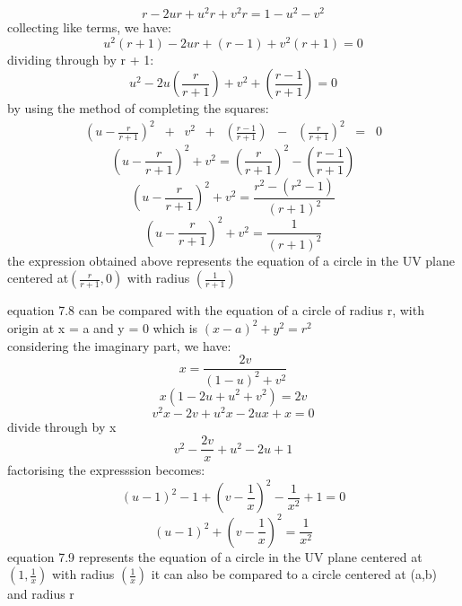 \begin{equation*}
r - 2ur + u^2r + v^2r = 1 - u^2 - v^2
\end{equation*}
collecting like terms, we have:
\begin{equation*}
u^2(r + 1) -2ur + (r - 1) + v^2(r + 1) = 0
\end{equation*}
dividing through by r + 1:
\begin{equation}
u^2 - 2u(\frac{r}{r + 1}) + v^2 +(\frac{r - 1}{r + 1}) = 0
\end{equation}
by using the method of completing the squares:\\
\begin{align*}
(u - \frac{r}{r+1})^2\;\;+\;\;v^2\;\;+\;\;(\frac{r-1}{r+1})\;\; - \;\;(\frac{r}{r+1})^2\;\; = \;\;0
\end{align*}
\begin{equation*}
(u - \frac{r}{r + 1})^2 + v^2 =(\frac{r}{r + 1})^2 -(\frac{r - 1}{r + 1}) 
\end{equation*}
\begin{equation*}
(u - \frac{r}{r + 1})^2+ v^2 =\frac{r^2 -(r^2 -1)}{(r + 1)^2}
\end{equation*}
\begin{equation}
(u - \frac{r}{r + 1})^2+ v^2 = \frac{1}{(r + 1)^2}
\end{equation}
the expression obtained above represents the equation of a circle in the UV plane centered at$ (\frac{r}{r + 1}, 0) $ with radius $ (\frac{1}{r + 1}) $

equation 7.8 can be compared  with  the equation of a circle of radius r, with origin at x = a and y = 0 which is $ (x - a)^2 + y^2 = r^2 $\\ 
considering the imaginary part, we have:
\begin{equation*}
x =\frac{2v}{(1 - u)^2 + v^2}
\end{equation*}
\begin{equation*}
x(1 - 2u + u^2 + v^2) = 2v
\end{equation*}
\begin{equation*}
v^2x - 2v + u^2x - 2ux + x = 0
\end{equation*}
divide through by x
\begin{equation*}
v^2 - \frac{2v}{x} +u^2 - 2u + 1
\end{equation*}
factorising the expresssion becomes:
\begin{equation*}
(u - 1)^2 -1 + (v - \frac{1}{x})^2 -\frac{1}{x^2} + 1 = 0
\end{equation*}
\begin{equation}
(u - 1)^2 + (v - \frac{1}{x})^2 = \frac{1}{x^2}
\end{equation}
equation 7.9 represents the equation of a circle in the UV plane centered at$ (1,\frac{1}{x}) $ with radius $ (\frac{1}{x}) $
it can also be compared to a circle centered at (a,b) and radius r

